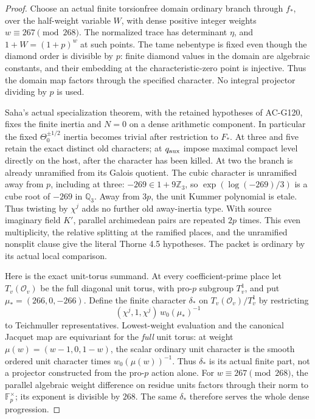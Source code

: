 \begin{proof}
Choose an actual finite torsionfree domain ordinary branch
through \(f_*\), over the half-weight variable \(W\), with
dense positive integer weights \(w\equiv267\pmod{268}\).
The normalized trace has determinant \(\eta\), and
\(1+W=(1+p)^w\) at such points.
The tame nebentype is fixed even though the diamond order is
divisible by \(p\): finite diamond values in the domain are
algebraic constants, and their embedding at the characteristic-zero
point is injective.  Thus the domain map factors through the
specified character.  No integral projector dividing by \(p\)
is used.

Saha's actual specialization theorem, with the retained hypotheses
of AC-G120, fixes the finite inertia and \(N=0\) on a dense
arithmetic component.  In particular the fixed
\(\Theta_0^{\pm1/2}\) inertia becomes trivial after restriction
to \(F_*\).  At three and five retain the exact distinct old
characters; at \(q_{\rm aux}\) impose maximal compact level
directly on the host, after the character has been killed.
At two the branch is already unramified from its Galois quotient.
The cubic character is unramified away from \(p\), including
at three: \(-269\in1+9\mathbb Z_3\), so
\(\exp(\log(-269)/3)\) is a cube root of \(-269\) in
\(\mathbb Q_3\).  Away from \(3p\), the unit Kummer
polynomial is etale.  Thus twisting by \(\chi^j\) adds
no further old away-inertia type.
With source imaginary field \(K'\), parallel archimedean pairs
are repeated \(2p\) times.  This even multiplicity, the relative
splitting at the ramified places, and the unramified nonsplit
clause give the literal Thorne 4.5 hypotheses.
The packet is ordinary by its actual local comparison.

Here is the exact unit-torus summand.  At every coefficient-prime
place let \(T_v(\mathcal O_v)\) be the full diagonal unit torus,
with pro-\(p\) subgroup \(T_v^1\), and put
\(\mu_*=(266,0,-266)\).
Define the finite character \(\delta_*\) on
\(T_v(\mathcal O_v)/T_v^1\) by restricting
\[
             (\chi^j,1,\chi^j)\,w_0(\mu_*)^{-1}
\]
to Teichmuller representatives.  Lowest-weight evaluation and
the canonical Jacquet map are equivariant for the \emph{full}
unit torus: at weight
\(\mu(w)=(w-1,0,1-w)\), the scalar ordinary unit character is
the smooth ordered unit character times \(w_0(\mu(w))^{-1}\).
Thus \(\delta_*\) is its actual finite part, not a projector
constructed from the pro-\(p\) action alone.  For
\(w\equiv267\pmod{268}\), the parallel algebraic weight difference
on residue units factors through their norm to \(\mathbb F_p^\times\);
its exponent is divisible by \(268\).  The same \(\delta_*\)
therefore serves the whole dense progression.


\end{proof}
